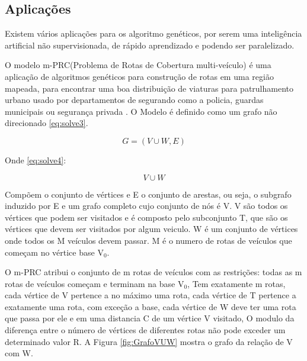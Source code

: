 \subsection{Aplicações}
Existem vários aplicações para os algoritmo genéticos, por serem uma inteligência artificial não supervisionada, de rápido aprendizado e podendo ser paralelizado.

O modelo m-PRC(Problema de Rotas de Cobertura multi-veículo) é uma aplicação de algoritmos genéticos para construção de rotas em uma região mapeada, para encontrar uma boa distribuição de viaturas para patrulhamento urbano usado por departamentos de segurando como a policia, guardas municipais ou segurança privada \cite{Washington}. 
O Modelo é definido como um grafo não direcionado \ref{eq:solve3}. 

\begin{equation} \label{eq:solve3}
G=(V\cup W, E)
\end{equation}

Onde \ref{eq:solve4}: 

\begin{equation} \label{eq:solve4}
V\cup W
\end{equation}


Compõem o conjunto de vértices e E o conjunto de arestas, ou seja, o subgrafo induzido por E e um grafo completo cujo conjunto de nós é V. 
V são todos os vértices que podem ser visitados e é composto pelo subconjunto T, que são os vértices que devem ser visitados por algum veiculo. W é um conjunto de vértices onde todos os M veículos devem passar. M é o numero de rotas de veículos que começam no vértice base V$_0$. 

O m-PRC atribui o conjunto de m rotas de veículos com as restrições: todas as m rotas de veículos começam e terminam na base V$_0$, Tem exatamente m rotas, cada vértice de V pertence a no máximo uma rota, cada vértice de T pertence a exatamente uma rota, com exceção a base, cada vértice de W deve ter uma rota que passa por ele e em uma distancia C de um vértice V visitado, O modulo da diferença entre o número de vértices de diferentes rotas não pode exceder um determinado valor R. A Figura \ref{fig:GrafoVUW} mostra o grafo da relação de V com W.

\begin{minipage}{\linewidth}
	\label{fig:GrafoVUW}
\end{minipage}


